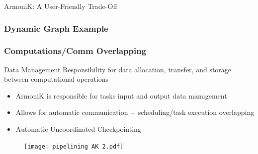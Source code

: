 \documentclass[10pt,aspectratio=1609]{beamer}
\begin{document}
\begin{section}{ArmoniK: A User-Friendly Trade-Off}
 \begin{frame}
   \frametitle{Dynamic Graph Example}
   \begin{figure}
     
   \end{figure}
 \end{frame}

 \begin{frame}
   \frametitle{Computations/Comm Overlapping}
   \begin{block}{Data Management}
     Responsibility for data allocation, transfer, and storage between computational operations
   \end{block}
   \begin{itemize}
     \item ArmoniK is responsible for tasks input and output data management
     \item Allows for automatic communication + scheduling/task execution overlapping
     \item Automatic Uncoordinated Checkpointing
   \end{itemize}
   \begin{figure}
     \texttt{[image: pipelining AK 2.pdf]}
   \end{figure}
 \end{frame}


\end{section}
\end{document}
